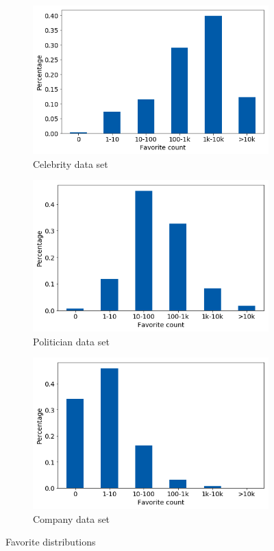 \begin{figure}[h]
\centering
\begin{subfigure}{.33\textwidth}
  \centering
  \includegraphics[width=.95\linewidth]{img/celeb_fav_distr}
  \caption{Celebrity data set}
  \label{fig:fav_distr_sub1}
\end{subfigure}%
\begin{subfigure}{.33\textwidth}
  \centering
  \includegraphics[width=.95\linewidth]{img/polit_fav_distr}
  \caption{Politician data set}
  \label{fig:fav_distr_sub2}
\end{subfigure}
\begin{subfigure}{.33\textwidth}
  \centering
  \includegraphics[width=.95\linewidth]{img/corp_fav_distr}
  \caption{Company data set}
  \label{fig:fav_distr_sub3}
\end{subfigure}%
\caption{Favorite distributions}
\label{fig:fav_distr}
\end{figure}

